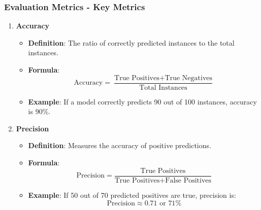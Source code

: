 \documentclass[aspectratio=169]{beamer}
\begin{document}
\begin{frame}[fragile]
    \frametitle{Evaluation Metrics - Key Metrics}
    \begin{enumerate}
        \item \textbf{Accuracy}
            \begin{itemize}
                \item \textbf{Definition}: The ratio of correctly predicted instances to the total instances.
                \item \textbf{Formula}:
                \begin{equation}
                \text{Accuracy} = \frac{\text{True Positives} + \text{True Negatives}}{\text{Total Instances}}
                \end{equation}
                \item \textbf{Example}: If a model correctly predicts 90 out of 100 instances, accuracy is 90\%.
            \end{itemize}
        
        \item \textbf{Precision}
            \begin{itemize}
                \item \textbf{Definition}: Measures the accuracy of positive predictions.
                \item \textbf{Formula}:
                \begin{equation}
                \text{Precision} = \frac{\text{True Positives}}{\text{True Positives} + \text{False Positives}}
                \end{equation}
                \item \textbf{Example}: If 50 out of 70 predicted positives are true, precision is:
                \begin{equation}
                \text{Precision} \approx 0.71 \text{ or } 71\%
                \end{equation}
            \end{itemize}
    \end{enumerate}
\end{frame}
\end{document}
